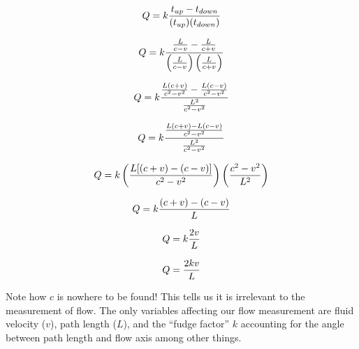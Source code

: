 $$Q = k {t_{up} - t_{down} \over (t_{up})(t_{down})}$$

$$Q = k {{L \over {c-v}} - {L \over {c+v}} \over \left({L \over {c-v}}\right) \left({L \over {c+v}}\right)}$$

$$Q = k {{L (c+v) \over {c^2-v^2}} - {L (c-v) \over {c^2-v^2}} \over {L^2 \over {c^2-v^2}}}$$

$$Q = k {{{L (c+v) - L (c-v)} \over {c^2-v^2}} \over {L^2 \over {c^2-v^2}}}$$

$$Q = k \left({{L [(c+v) - (c-v)]} \over {c^2-v^2}}\right) \left({{c^2-v^2} \over L^2}\right)$$

$$Q = k {{(c+v) - (c-v)} \over L}$$

$$Q = k {2v \over L}$$

$$Q = {2kv \over L}$$

Note how $c$ is nowhere to be found!  This tells us it is irrelevant to the measurement of flow.  The only variables affecting our flow measurement are fluid velocity ($v$), path length ($L$), and the ``fudge factor'' $k$ accounting for the angle between path length and flow axis among other things.




